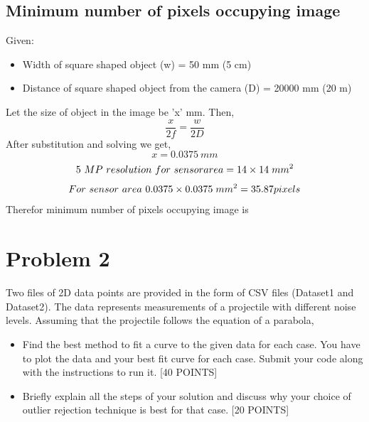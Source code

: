 \documentclass{article}
\begin{document}
\subsection{Minimum number of pixels occupying image}
Given:
\begin{itemize}
    \item Width of square shaped object (w) = 50 mm (5 cm)
    \item Distance of square shaped object from the camera (D) = 20000 mm (20 m)
\end{itemize}
Let the size of object in the image be 'x' mm. Then, 
\begin{equation}
\boxed{\frac{x}{2f}=\frac{w}{2D}}
\end{equation}
After substitution and solving we get,
\begin{equation}
\boxed{x = 0.0375 \ mm}
\end{equation}
\begin{equation}
5 \ MP \ resolution \ for \ sensor area = 14\times14\hspace{.1cm}mm ^2 \\
\end{equation}
\begin{equation}
For \ sensor \ area \ 0.0375\times0.0375\hspace{.1cm}mm ^2 = 35.87 pixels \\
\end{equation}
Therefor minimum number of pixels occupying image is 

\section{Problem 2}
Two files of 2D data points are provided in the form of CSV files (Dataset1 and Dataset2). The data represents measurements of a projectile with different noise levels. Assuming that the projectile follows the equation of a parabola,
\begin{itemize}
    \item Find the best method to fit a curve to the given data for each case. You have to plot the data and your best fit curve for each case. Submit your code along with the instructions to run it. [40 POINTS]
    \item Briefly explain all the steps of your solution and discuss why your choice of outlier rejection technique is best for that case. [20 POINTS]
\end{itemize}
\end{document}
